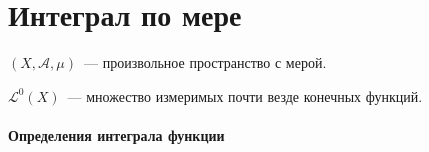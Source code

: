 \documentclass{article}
\begin{document}
\newcommand{\R}[0]{\mathbb{R}}
\newcommand{\RM}[0]{\mathbb{R}^m}
\newcommand{\dist}[0]{\mathrm{dist}}
\newcommand{\rang}[0]{\mathrm{rang} $\ $}
\newcommand{\grad}[0]{\mathrm{grad} $\ $}
\newcommand{\Lin}[0]{\mathrm{Lin} $\ $}

\tableofcontents

\newpage 

\part{Интеграл по мере}

    $(X, \mathcal{A}, \mu)$~--- произвольное пространство с мерой.
    
    $\mathcal{L}^0 (X)$~--- множество измеримых почти везде конечных функций.
    
    \subsection{Определения интеграла функции}
    
\end{document}

